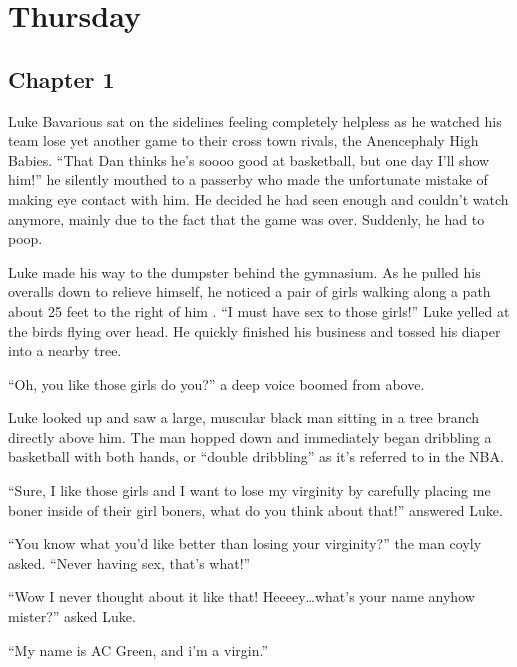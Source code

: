 \chapter{Thursday}

\section*{Chapter 1}

Luke Bavarious sat on the sidelines feeling completely helpless as
he watched his team lose yet another game to their cross town
rivals, the Anencephaly High Babies. ``That Dan thinks he's soooo
good at basketball, but one day I'll show him!'' he silently
mouthed to a passerby who made the unfortunate mistake of making
eye contact with him. He decided he had seen enough and couldn't
watch anymore, mainly due to the fact that the game was over.
Suddenly, he had to poop.



Luke made his way to the dumpster behind the gymnasium. As he
pulled his overalls down to relieve himself, he noticed a pair of
girls walking along a path about 25 feet to the right of him . ``I
must have sex to those girls!'' Luke yelled at the birds flying over
head. He quickly finished his business and tossed his diaper into a
nearby tree.



``Oh, you like those girls do you?'' a deep voice boomed from
above.



Luke looked up and saw a large, muscular black man sitting in a
tree branch directly above him. The man hopped down and immediately
began dribbling a basketball with both hands, or ``double dribbling''
as it's referred to in the NBA.



``Sure, I like those girls and I want to lose my virginity by
carefully placing me boner inside of their girl boners, what do you
think about that!'' answered Luke.



``You know what you'd like better than losing your virginity?''
the man coyly asked. ``Never having sex, that's what!''



``Wow I never thought about it like that! Heeeey{\ldots}what's your
name anyhow mister?'' asked Luke.



``My name is AC Green, and i'm a virgin.''




